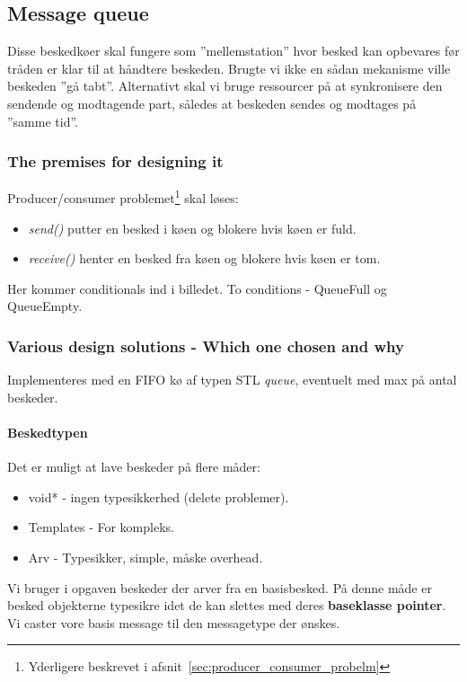 \subsection{Message queue}
Disse beskedkøer skal fungere som ''mellemstation'' hvor besked kan opbevares før tråden er klar til at håndtere beskeden. Brugte vi ikke en sådan mekanisme ville beskeden ''gå tabt''. Alternativt skal vi bruge ressourcer på at synkronisere den sendende og modtagende part, således at beskeden sendes og modtages på ''samme tid''.

\subsubsection{The premises for designing it}
Producer/consumer problemet\footnote{Yderligere beskrevet i afsnit~\ref{sec:producer_consumer_probelm}} skal løses:
\begin{itemize}
	\item \textit{send()}
	putter en besked i køen og blokere hvis køen er fuld.
	
	\item \textit{receive()}
	henter en besked fra køen og blokere hvis køen er tom.
\end{itemize}
Her kommer conditionals ind i billedet. To conditions - QueueFull og QueueEmpty.

\subsubsection{Various design solutions - Which one chosen and why}
Implementeres med en FIFO kø af typen STL \textit{queue}, eventuelt med max på antal beskeder.

\paragraph{Beskedtypen}
Det er muligt at lave beskeder på flere måder:
\begin{itemize}
	\item void* - ingen typesikkerhed (delete problemer).
	\item Templates - For kompleks.
	\item Arv - Typesikker, simple, måske overhead.
\end{itemize}

Vi bruger i opgaven beskeder der arver fra en basisbesked. På denne måde er besked objekterne typesikre idet de kan slettes med deres \textbf{baseklasse pointer}.
Vi caster vore basis message til den messagetype der ønskes.

